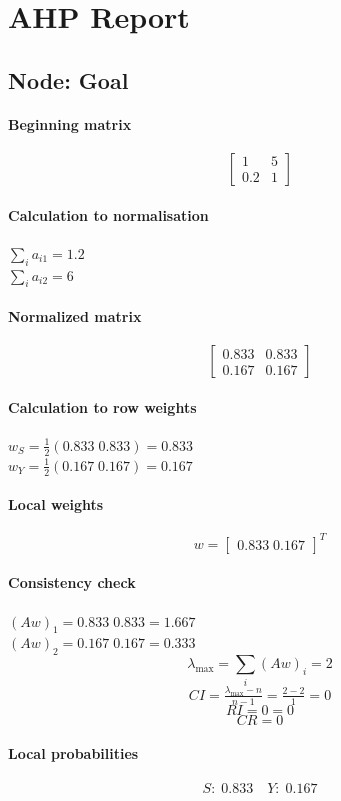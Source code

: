 \section*{AHP Report}
\subsection*{Node: Goal}
\paragraph{Beginning matrix}
\[\begin{bmatrix}
1 & 5 \\
0.2 & 1
\end{bmatrix}\]
\paragraph{Calculation to normalisation}
\(\sum_i a_{i1} = 1.2\) \\ \(\sum_i a_{i2} = 6\)
\paragraph{Normalized matrix}
\[\begin{bmatrix}
0.833 & 0.833 \\
0.167 & 0.167
\end{bmatrix}\]
\paragraph{Calculation to row weights}
\(w_{S} = \tfrac{1}{2}(0.833 \; 0.833) = 0.833\) \\ \(w_{Y} = \tfrac{1}{2}(0.167 \; 0.167) = 0.167\)
\paragraph{Local weights}
\[w = \begin{bmatrix} 0.833 \; 0.167 \end{bmatrix}^{\!T}\]
\paragraph{Consistency check}
\((Aw)_{1} = 0.833 \; 0.833 = 1.667\) \\ \((Aw)_{2} = 0.167 \; 0.167 = 0.333\)
\[\lambda_{\max} = \sum_i (Aw)_i = 2\]
\[CI = \tfrac{\lambda_{\max}-n}{n-1} = \tfrac{2 - 2}{1} = 0\]
\[RI = 0 = 0\]
\[CR = 0\]
\paragraph{Local probabilities}
\[S:\; 0.833\quad Y:\; 0.167\]
